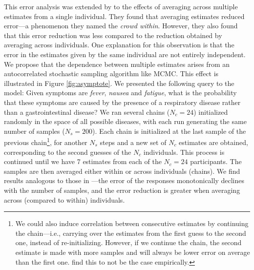 This error analysis was extended by \cite{vul08} to the effects of averaging across multiple estimates from a single individual. They found that averaging estimates reduced error---a phenomenon they named the \emph{crowd within}. However, they also found that this error reduction was less compared to the reduction obtained by averaging across individuals. One explanation for this observation is that the error in the estimates given by the same individual are not entirely independent. We propose that the dependence between multiple estimates arises from an autocorrelated stochastic sampling algorithm like MCMC.
This effect is illustrated in Figure \ref{fig:asymptote}. We presented the following query to the model: Given symptoms are \emph{fever}, \emph{nausea} and \emph{fatigue}, what is the probability that these symptoms are caused by the presence of a respiratory disease rather than a gastrointestinal disease? We ran several chains ($N_c = 24$) initialized randomly in the space of all possible diseases, with each run generating the same number of samples ($N_s = 200$). Each chain is initialized at the last sample of the previous chain\footnote{We could also induce correlation between consecutive estimates by continuing the chain---i.e., carrying over the estimates from the first guess to the second one, instead of re-initializing. However, if we continue the chain, the second estimate is made with more samples and will always be lower error on average than the first one. \cite{vul08} find this to not be the case empirically.}, for another $N_s$ steps and a new set of $N_c$ estimates are obtained, corresponding to the second guesses of the $N_c$ individuals. This process is continued until we have 7 estimates from each of the $N_c = 24$ participants. The samples are then averaged either within or across individuals (chains). We find results analogous to those in \cite{vul08}---the error of the responses monotonically declines with the number of samples, and the error reduction is greater when averaging across (compared to within) individuals.

